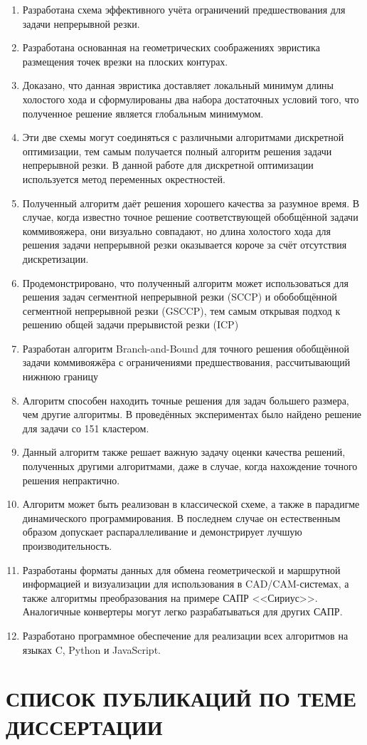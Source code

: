 \documentclass[14pt]{extarticle}
\begin{document}
\begin{enumerate}
    \item 
    Разработана схема эффективного учёта ограничений предшествования для
    задачи непрерывной резки.
    \item 
    Разработана основанная на геометрических соображениях эвристика
    размещения точек врезки на плоских контурах.
    \item 
    Доказано, что данная эвристика доставляет локальный минимум длины холостого хода
    и сформулированы два набора достаточных условий того,
    что полученное решение является глобальным минимумом.
    \item 
    Эти две схемы могут соединяться с различными алгоритмами дискретной оптимизации,
    тем самым получается полный алгоритм решения задачи непрерывной резки.
    В данной работе для дискретной оптимизации используется
    метод переменных окрестностей.
    \item
    Полученный алгоритм даёт решения хорошего качества за разумное время. 
    В случае, когда известно точное решение соответствующей обобщённой
    задачи коммивояжера, они визуально совпадают, но длина холостого
    хода для решения задачи непрерывной резки оказывается короче за счёт
    отсутствия дискретизации.
    \item
    Продемонстрировано, что полученный алгоритм может использоваться для 
    решения задач сегментной непрерывной резки (SCCP) 
    и обобобщённой сегментной непрерывной резки (GSCCP),
    тем самым открывая подход к решению общей задачи прерывистой резки
    (ICP)
    \item 
    Разработан алгоритм Branch-and-Bound для точного решения
    обобщённой задачи коммивояжёра с ограничениями предшествования,
    рассчитывающий нижнюю границу
    \item 
    Алгоритм способен находить точные решения для задач большего размера,
    чем другие алгоритмы. 
    В проведённых экспериментах было найдено решение для 
    задачи со 151 кластером.
    \item 
    Данный алгоритм также решает важную задачу оценки качества
    решений, полученных другими алгоритмами,
    даже в случае, когда нахождение точного решения непрактично.
    \item 
    Алгоритм может быть реализован в классической схеме,
    а также в парадигме динамического программирования. 
    В последнем случае он естественным образом допускает
    распараллеливание и демонстрирует лучшую производительность.
    \item 
    Разработаны форматы данных для обмена геометрической и маршрутной 
    информацией и визуализации для использования в CAD/CAM-системах, 
    а также алгоритмы преобразования на примере САПР <<Сириус>>.
    Аналогичные конвертеры могут легко разрабатываться для других САПР.
    \item 
    Разработано программное обеспечение для реализации всех алгоритмов
    на языках C, Python и JavaScript.
\end{enumerate}

\section*{СПИСОК ПУБЛИКАЦИЙ ПО ТЕМЕ ДИССЕРТАЦИИ}
\end{document}

